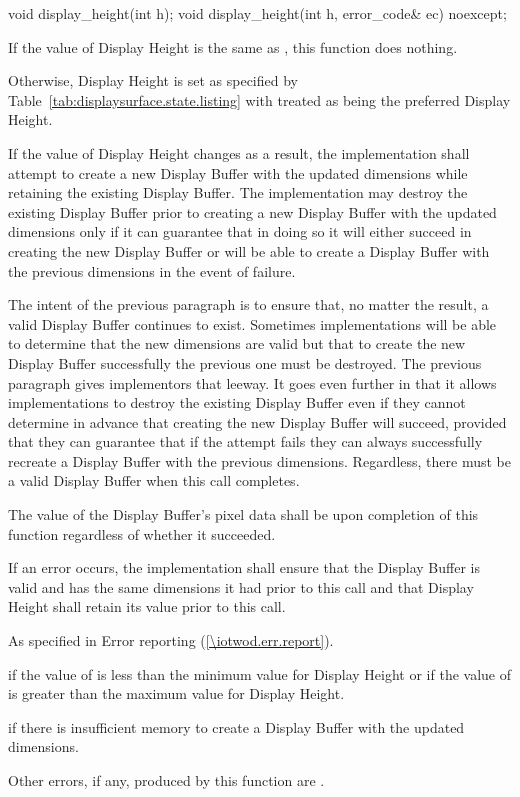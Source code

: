 \begin{itemdecl}
void display_height(int h);
void display_height(int h, error_code& ec) noexcept;
\end{itemdecl}
\begin{itemdescr}
\pnum
\effects
If the value of Display Height is the same as , this function does nothing.

\pnum
Otherwise, Display Height is set as specified by Table~\ref{tab:displaysurface.state.listing} with  treated as being the preferred Display Height.

\pnum
If the value of Display Height changes as a result, the implementation shall attempt to create a new Display Buffer with the updated dimensions while retaining the existing Display Buffer. The implementation may destroy the existing Display Buffer prior to creating a new Display Buffer with the updated dimensions only if it can guarantee that in doing so it will either succeed in creating the new Display Buffer or will be able to create a Display Buffer with the previous dimensions in the event of failure.

\pnum
\begin{note}
The intent of the previous paragraph is to ensure that, no matter the result, a valid Display Buffer continues to exist. Sometimes implementations will be able to determine that the new dimensions are valid but that to create the new Display Buffer successfully the previous one must be destroyed. The previous paragraph gives implementors that leeway. It goes even further in that it allows implementations to destroy the existing Display Buffer even if they cannot determine in advance that creating the new Display Buffer will succeed, provided that they can guarantee that if the attempt fails they can always successfully recreate a Display Buffer with the previous dimensions. Regardless, there must be a valid Display Buffer when this call completes.
\end{note}

\pnum
The value of the Display Buffer's pixel data shall be \unspecnorm upon completion of this function regardless of whether it succeeded.

\pnum
If an error occurs, the implementation shall ensure that the Display Buffer is valid and has the same dimensions it had prior to this call and that Display Height shall retain its value prior to this call.

\pnum
\throws
As specified in Error reporting (\ref{\iotwod.err.report}).

\pnum
\errors
{} if the value of  is less than the minimum value for Display Height or if the value of  is greater than the maximum value for Display Height.

 if there is insufficient memory to create a Display Buffer with the updated dimensions.

Other errors, if any, produced by this function are .
\end{itemdescr}


